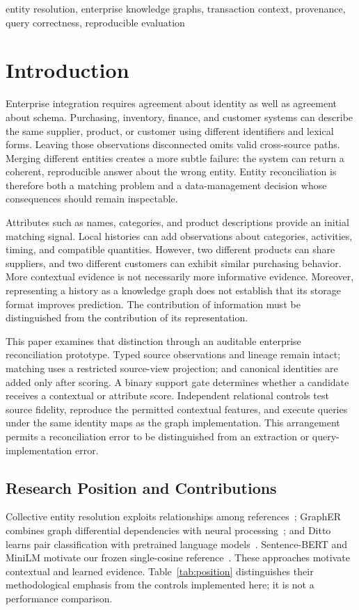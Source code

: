 \documentclass[conference,letterpaper]{IEEEtran}
\begin{document}
\begin{IEEEkeywords}
entity resolution, enterprise knowledge graphs, transaction context, provenance, query correctness, reproducible evaluation
\end{IEEEkeywords}

\section{Introduction}
Enterprise integration requires agreement about identity as well as agreement about schema. Purchasing, inventory, finance, and customer systems can describe the same supplier, product, or customer using different identifiers and lexical forms. Leaving those observations disconnected omits valid cross-source paths. Merging different entities creates a more subtle failure: the system can return a coherent, reproducible answer about the wrong entity. Entity reconciliation is therefore both a matching problem and a data-management decision whose consequences should remain inspectable.

Attributes such as names, categories, and product descriptions provide an initial matching signal. Local histories can add observations about categories, activities, timing, and compatible quantities. However, two different products can share suppliers, and two different customers can exhibit similar purchasing behavior. More contextual evidence is not necessarily more informative evidence. Moreover, representing a history as a knowledge graph does not establish that its storage format improves prediction. The contribution of information must be distinguished from the contribution of its representation.

This paper examines that distinction through an auditable enterprise reconciliation prototype. Typed source observations and lineage remain intact; matching uses a restricted source-view projection; and canonical identities are added only after scoring. A binary support gate determines whether a candidate receives a contextual or attribute score. Independent relational controls test source fidelity, reproduce the permitted contextual features, and execute queries under the same identity maps as the graph implementation. This arrangement permits a reconciliation error to be distinguished from an extraction or query-implementation error.

\subsection{Research Position and Contributions}
Collective entity resolution exploits relationships among references~\cite{bhattacharya2007}; GraphER combines graph differential dependencies with neural processing~\cite{grapher2025}; and Ditto learns pair classification with pretrained language models~\cite{ditto2020}. Sentence-BERT and MiniLM motivate our frozen single-cosine reference~\cite{sbert2019,minilm2020,minilmcard}. These approaches motivate contextual and learned evidence. Table~\ref{tab:position} distinguishes their methodological emphasis from the controls implemented here; it is not a performance comparison.
\end{document}
